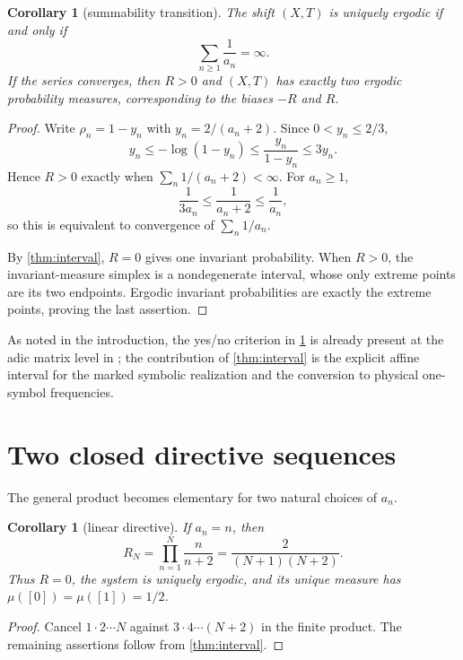 \documentclass[11pt,a4paper]{amsart}
\newtheorem{corollary}[theorem]{Corollary}
\theoremstyle{definition}
\theoremstyle{remark}
\begin{document}
\begin{corollary}[summability transition]\label{cor:transition}
The shift $(X,T)$ is uniquely ergodic if and only if
\begin{equation}\label{eq:summability}
 \sum_{n\geq1}\frac1{a_n}=\infty.
\end{equation}
If the series converges, then $R>0$ and $(X,T)$ has exactly two ergodic
probability measures, corresponding to the biases $-R$ and $R$.
\end{corollary}

\begin{proof}
Write $\rho_n=1-y_n$ with $y_n=2/(a_n+2)$.  Since
$0<y_n\leq2/3$,
\[
 y_n\leq-\log(1-y_n)\leq\frac{y_n}{1-y_n}\leq3y_n.
\]
Hence $R>0$ exactly when $\sum_n1/(a_n+2)<\infty$.  For $a_n\geq1$,
\[
 \frac1{3a_n}\leq\frac1{a_n+2}\leq\frac1{a_n},
\]
so this is equivalent to convergence of $\sum_n1/a_n$.

By \cref{thm:interval}, $R=0$ gives one invariant probability.  When
$R>0$, the invariant-measure simplex is a nondegenerate interval, whose only
extreme points are its two endpoints.  Ergodic invariant probabilities are
exactly the extreme points, proving the last assertion.
\end{proof}

As noted in the introduction, the yes/no criterion in
\cref{cor:transition} is already present at the adic matrix level in
\cite{FerencziFisherTalet2009}; the contribution of
\cref{thm:interval} is the explicit affine interval for the marked symbolic
realization and the conversion to physical one-symbol frequencies.

\section{Two closed directive sequences}

The general product becomes elementary for two natural choices of $a_n$.

\begin{corollary}[linear directive]\label{cor:linear}
If $a_n=n$, then
\begin{equation}\label{eq:linear-product}
 R_N=\prod_{n=1}^{N}\frac{n}{n+2}
 =\frac{2}{(N+1)(N+2)}.
\end{equation}
Thus $R=0$, the system is uniquely ergodic, and its unique measure has
$\mu([0])=\mu([1])=1/2$.
\end{corollary}

\begin{proof}
Cancel $1\cdot2\cdots N$ against $3\cdot4\cdots(N+2)$ in the finite
product.  The remaining assertions follow from \cref{thm:interval}.
\end{proof}
\end{document}
